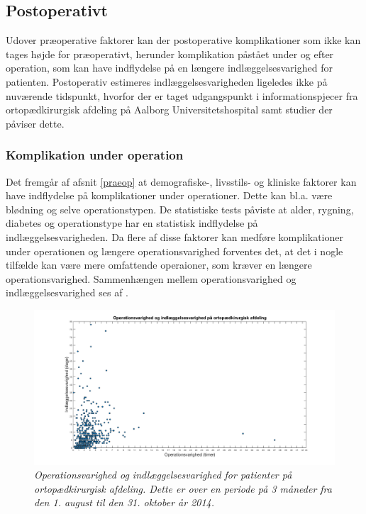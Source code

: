 \subsection{Postoperativt}
Udover præoperative faktorer kan der postoperative komplikationer som ikke kan tages højde for præoperativt, herunder komplikation påstået under og efter operation, som kan have indflydelse på en længere indlæggelsesvarighed for patienten. Postoperativ estimeres indlæggelsesvarigheden ligeledes ikke på nuværende tidspunkt, hvorfor der er taget udgangspunkt i informationspjecer fra ortopædkirurgisk afdeling på Aalborg Universitetshospital samt studier der påviser dette.

\subsubsection{Komplikation under operation}
Det fremgår af afsnit \ref{praeop} at demografiske-, livsstils- og kliniske faktorer kan have indflydelse på komplikationer under operationer. Dette kan bl.a. være blødning og selve operationstypen. De statistiske tests påviste at alder, rygning, diabetes og operationstype har en statistisk indflydelse på indlæggelsesvarigheden. Da flere af disse faktorer kan medføre komplikationer under operationen og længere operationsvarighed forventes det, at det i nogle tilfælde kan være mere omfattende operaioner, som kræver en længere operationsvarighed. Sammenhængen mellem operationsvarighed og indlæggelsesvarighed ses af .


\begin{figure}[H]
	\centering
	\includegraphics[scale=0.35]{figures/opindlaeg.png}
	\caption{\textit{Operationsvarighed og indlæggelsesvarighed for patienter på ortopædkirurgisk afdeling. Dette er over en periode på 3 måneder fra den 1. august til den 31. oktober år 2014.}}
	\label{opindlaeg}
	\end{figure}

